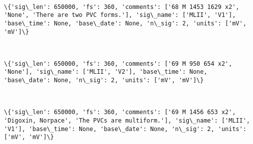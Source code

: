 \documentclass[11pt]{article}
\begin{document}
    \begin{center}
    \end{center}
    { \hspace*{\fill} \\}
    
    \begin{Verbatim}[commandchars=\\\{\}]
\{'sig\_len': 650000, 'fs': 360, 'comments': ['68 M 1453 1629 x2', 'None', 'There are two PVC forms.'], 'sig\_name': ['MLII', 'V1'], 'base\_time': None, 'base\_date': None, 'n\_sig': 2, 'units': ['mV', 'mV']\}

    \end{Verbatim}

    \begin{center}
    \end{center}
    { \hspace*{\fill} \\}
    
    \begin{Verbatim}[commandchars=\\\{\}]
\{'sig\_len': 650000, 'fs': 360, 'comments': ['69 M 950 654 x2', 'None'], 'sig\_name': ['MLII', 'V2'], 'base\_time': None, 'base\_date': None, 'n\_sig': 2, 'units': ['mV', 'mV']\}

    \end{Verbatim}

    \begin{center}
    \end{center}
    { \hspace*{\fill} \\}
    
    \begin{Verbatim}[commandchars=\\\{\}]
\{'sig\_len': 650000, 'fs': 360, 'comments': ['69 M 1456 653 x2', 'Digoxin, Norpace', 'The PVCs are multiform.'], 'sig\_name': ['MLII', 'V1'], 'base\_time': None, 'base\_date': None, 'n\_sig': 2, 'units': ['mV', 'mV']\}

    \end{Verbatim}

    \begin{center}
    \end{center}
    { \hspace*{\fill} \\}
    
\end{document}
